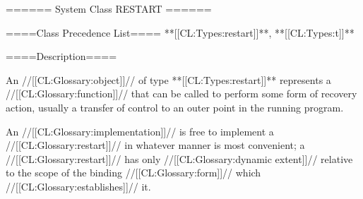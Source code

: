 ====== System Class RESTART ======

====Class Precedence List==== **[[CL:Types:restart]]**, **[[CL:Types:t]]**

====Description====

An //[[CL:Glossary:object]]// of type **[[CL:Types:restart]]** represents a //[[CL:Glossary:function]]// that can be called to perform some form of recovery action, usually a transfer of control to an outer point in the running program.

An //[[CL:Glossary:implementation]]// is free to implement a //[[CL:Glossary:restart]]// in whatever manner is most convenient; a //[[CL:Glossary:restart]]// has only //[[CL:Glossary:dynamic extent]]// relative to the scope of the binding //[[CL:Glossary:form]]// which //[[CL:Glossary:establishes]]// it.

